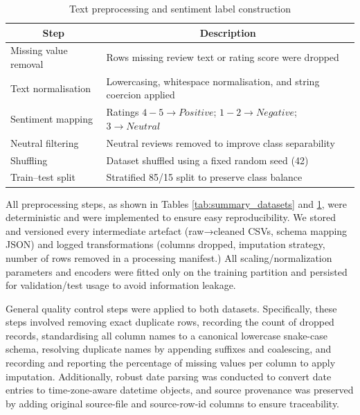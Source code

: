 \documentclass[authoryear,review,3p,times,12pt]{elsarticle}
\begin{document}
\begin{table}
\centering
\renewcommand{\arraystretch}{1.15}
\caption{Text preprocessing and sentiment label construction}
\label{tab:text_processing}
\begin{tabular}{p{5cm} p{10cm}}
\hline
\multicolumn{1}{c}{\textbf{Step}} & \multicolumn{1}{c}{\textbf{Description}}                \\ \hline
Missing value   removal & Rows missing   review text or rating score were dropped              \\
Text   normalisation    & Lowercasing,   whitespace normalisation, and string coercion applied \\
Sentiment   mapping               & Ratings $4 - 5 \rightarrow Positive$; $1 - 2 \rightarrow Negative$; $3 \rightarrow Neutral$                                                      \\
Neutral   filtering               & Neutral reviews removed to improve class separability \\
Shuffling                         & Dataset shuffled using a fixed random seed (42)       \\
Train–test split                  & Stratified 85/15 split to preserve class balance  \\ \hline   
\end{tabular}
\end{table}

All preprocessing steps, as shown in Tables \ref{tab:summary_datasets} and \ref{tab:text_processing}, were deterministic and were implemented to ensure easy reproducibility. We stored and versioned every intermediate artefact (raw→cleaned CSVs, schema mapping JSON) and logged transformations (columns dropped, imputation strategy, number of rows removed in a processing manifest.) All scaling/normalization parameters and encoders were fitted only on the training partition and persisted for validation/test usage to avoid information leakage.

General quality control steps were applied to both datasets. Specifically, these steps involved removing exact duplicate rows, recording the count of dropped records, standardising all column names to a canonical lowercase snake-case schema, resolving duplicate names by appending suffixes and coalescing, and recording and reporting the percentage of missing values per column to apply imputation. Additionally, robust date parsing was conducted to convert date entries to time-zone-aware datetime objects, and source provenance was preserved by adding original source-file and source-row-id columns to ensure traceability.
\end{document}
